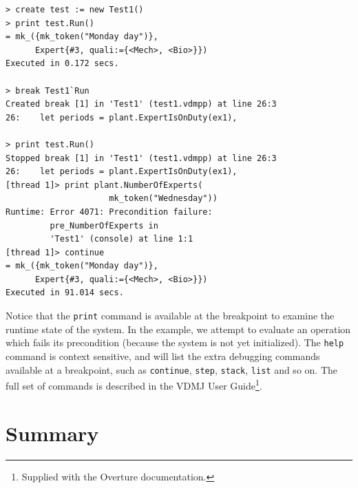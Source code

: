 \begin{lstlisting}
> create test := new Test1()
> print test.Run()
= mk_({mk_token("Monday day")}, 
      Expert{#3, quali:={<Mech>, <Bio>}})
Executed in 0.172 secs.

> break Test1`Run
Created break [1] in 'Test1' (test1.vdmpp) at line 26:3
26:    let periods = plant.ExpertIsOnDuty(ex1),

> print test.Run()
Stopped break [1] in 'Test1' (test1.vdmpp) at line 26:3
26:    let periods = plant.ExpertIsOnDuty(ex1),
[thread 1]> print plant.NumberOfExperts(
                     mk_token("Wednesday"))
Runtime: Error 4071: Precondition failure: 
         pre_NumberOfExperts in 
         'Test1' (console) at line 1:1
[thread 1]> continue
= mk_({mk_token("Monday day")}, 
      Expert{#3, quali:={<Mech>, <Bio>}})
Executed in 91.014 secs. 
\end{lstlisting}

\noindent Notice that the \verb|print| command is available at the breakpoint
to examine the runtime state of the system. In the example, we attempt to evaluate an
operation which fails its precondition (because the system is not yet
initialized). The \verb|help| command is context sensitive, and will list the
extra debugging commands available at a breakpoint, such as \verb|continue|,
\verb|step|, \verb|stack|, \verb|list| and so on. The full set of commands is
described in the VDMJ User Guide\footnote{Supplied with the Overture
documentation.}.

\lstset{style=mystyle,language=VDM++}

\section{Summary}\label{sec:toolintrosummary}

